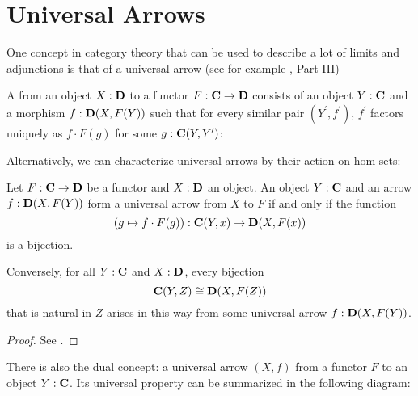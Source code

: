 \section{Universal Arrows}

One concept in category theory that can be used to describe a lot of limits and adjunctions is that of a universal arrow (see for example \autocite{MacLane}, Part III)
\begin{definition}
  A  from an object $ X: \mathbf{D} $ to a functor $ F: \mathbf{C} \to \mathbf{D} $ consists of an object $ Y: \mathbf{C} $ and a morphism $ f: \mathbf{D}(X, F(Y)) $ such that for every similar pair $ (Y^\prime, f^\prime) $, $ f^\prime $ factors uniquely as $ f \cdot F(g) $ for some $ g: \mathbf{C}(Y, Y^\prime) $:
  \begin{center}
  \end{center}
\end{definition}

Alternatively, we can characterize universal arrows by their action on hom-sets:
\begin{lemma}
  Let $ F: \mathbf{C} \to \mathbf{D} $ be a functor and $ X: \mathbf{D} $ an object. An object $ Y: \mathbf{C} $ and an arrow $ f: \mathbf{D}(X, F(Y)) $ form a universal arrow from $ X $ to $ F $ if and only if the function
  \[ (g \mapsto f \cdot F(g)) : \mathbf{C}(Y, x) \to \mathbf{D}(X, F(x)) \]
  is a bijection.

  Conversely, for all $ Y: \mathbf{C} $ and $ X: \mathbf{D} $, every bijection
  \[ \mathbf{C}(Y, Z) \cong \mathbf{D}(X, F(Z)) \]
  that is natural in $ Z $ arises in this way from some universal arrow $ f: \mathbf{D}(X, F(Y)) $.
\end{lemma}
\begin{proof}
  See \autocite[][Chapter III.2, Proposition 1]{MacLane}.
\end{proof}

There is also the dual concept: a universal arrow $ (X, f) $ from a functor $ F $ to an object $ Y: \mathbf{C} $. Its universal property can be summarized in the following diagram:
\begin{center}
\end{center}

